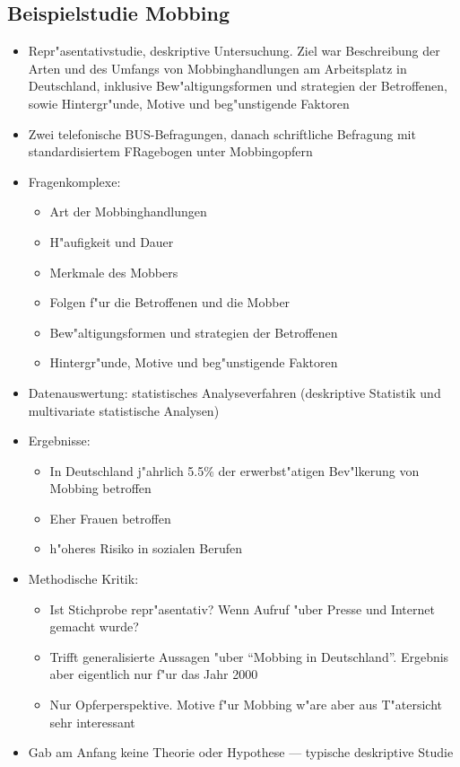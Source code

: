 \subsection{Beispielstudie Mobbing}
\begin{itemize}
	\item
		Repr"asentativstudie, deskriptive Untersuchung. Ziel war Beschreibung der Arten und des Umfangs von Mobbinghandlungen am Arbeitsplatz in Deutschland, inklusive Bew"altigungsformen und strategien der Betroffenen, sowie Hintergr"unde, Motive und beg"unstigende Faktoren
	\item
		Zwei telefonische BUS-Befragungen, danach schriftliche Befragung mit standardisiertem FRagebogen unter Mobbingopfern
	\item
		Fragenkomplexe:
		\begin{itemize}
			\item
				Art der Mobbinghandlungen
			\item
				H"aufigkeit und Dauer
			\item
				Merkmale des Mobbers
			\item
				Folgen f"ur die Betroffenen und die Mobber
			\item
				Bew"altigungsformen und strategien der Betroffenen
			\item
				Hintergr"unde, Motive und beg"unstigende Faktoren
		\end{itemize}
	\item
		Datenauswertung: statistisches Analyseverfahren (deskriptive Statistik und multivariate statistische Analysen)
	\item
		Ergebnisse:
		\begin{itemize}
			\item
				In Deutschland j"ahrlich 5.5\% der erwerbst"atigen Bev"lkerung von Mobbing betroffen
			\item
				Eher Frauen betroffen
			\item
				h"oheres Risiko in sozialen Berufen
		\end{itemize}
	\item
		Methodische Kritik:
		\begin{itemize}
			\item
				Ist Stichprobe repr"asentativ? Wenn Aufruf "uber Presse und Internet gemacht wurde?
			\item
				Trifft generalisierte Aussagen "uber \enquote{Mobbing in Deutschland}. Ergebnis aber eigentlich nur f"ur das Jahr 2000
			\item
				Nur Opferperspektive. Motive f"ur Mobbing w"are aber aus T"atersicht sehr interessant
		\end{itemize}
	\item
		Gab am Anfang keine Theorie oder Hypothese --- typische deskriptive Studie
\end{itemize}

